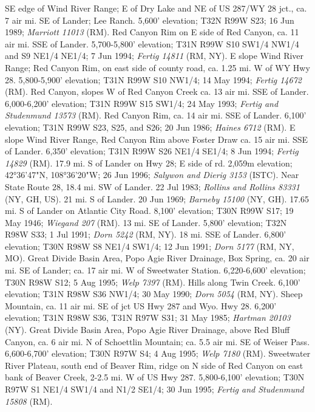 SE edge of Wind River Range; E of Dry Lake and NE of US 287/WY 28 jct., ca. 7
air mi. SE of Lander; Lee Ranch. 5,600' elevation; T32N R99W S23; 16 Jun 1989;
\textit{Marriott 11013} (RM).
Red Canyon Rim on E side of Red Canyon, ca. 11 air mi. SSE of Lander.
5,700-5,800' elevation; T31N R99W S10 SW1/4 NW1/4 and S9 NE1/4 NE1/4;
7 Jun 1994; \textit{Fertig 14811} (RM, NY).
E slope Wind River Range; Red Canyon Rim, on east side of county road, ca. 1.25
mi. W of WY Hwy 28. 5,800-5,900' elevation; T31N R99W S10 NW1/4; 14 May 1994;
\textit{Fertig 14672} (RM).
Red Canyon, slopes W of Red Canyon Creek ca. 13 air mi. SSE of Lander.
6,000-6,200' elevation; T31N R99W S15 SW1/4; 24 May 1993;
\textit{Fertig and Studenmund 13573} (RM).
Red Canyon Rim, ca. 14 air mi. SSE of Lander. 6,100' elevation; T31N R99W S23,
S25, and S26; 20 Jun 1986; \textit{Haines 6712} (RM).
E slope Wind River Range, Red Canyon Rim above Foster Draw ca. 15 air mi. SSE
of Lander.  6,350' elevation; T31N R99W S26 NE1/4 SE1/4; 8 Jun 1994;
\textit{Fertig 14829} (RM).
17.9 mi. S of Lander on Hwy 28; E side of rd. 2,059m elevation;
42°36'47"N, 108°36'20"W; 26 Jun 1996; \textit{Salywon and Dierig 3153} (ISTC).
Near State Route 28, 18.4 mi. SW of Lander. 22 Jul 1983;
\textit{Rollins and Rollins 83331} (NY, GH, US).
21 mi. S of Lander. 20 Jun 1969; \textit{Barneby 15100} (NY, GH).
17.65 mi. S of Lander on Atlantic City Road. 8,100' elevation; T30N R99W S17;
19 May 1946; \textit{Wiegand 207} (RM).
13 mi. SE of Lander. 5,800' elevation; T32N R98W S33; 1 Jul 1991;
\textit{Dorn 5242} (RM, NY).
18 mi. SSE of Lander. 6,800' elevation; T30N R98W S8 NE1/4 SW1/4; 12 Jun 1991;
\textit{Dorn 5177} (RM, NY, MO).
Great Divide Basin Area, Popo Agie River Drainage, Box Spring, ca. 20 air mi.
SE of Lander; ca. 17 air mi. W of Sweetwater Station. 6,220-6,600' elevation;
T30N R98W S12; 5 Aug 1995; \textit{Welp 7397} (RM).
Hills along Twin Creek. 6,100' elevation; T31N R98W S36 NW1/4; 30 May 1990;
\textit{Dorn 5054} (RM, NY).
Sheep Mountain, ca. 11 air mi. SE of jct US Hwy 287 and Wyo. Hwy 28.
6,200' elevation; T31N R98W S36, T31N R97W S31; 31 May 1985;
\textit{Hartman 20103} (NY).
Great Divide Basin Area, Popo Agie River Drainage, above Red Bluff Canyon, ca.
6 air mi. N of Schoettlin Mountain; ca. 5.5 air mi. SE of Weiser Pass.
6,600-6,700' elevation; T30N R97W S4; 4 Aug 1995; \textit{Welp 7180} (RM).
Sweetwater River Plateau, south end of Beaver Rim, ridge on N side of Red Canyon
on east bank of Beaver Creek, 2-2.5 mi. W of US Hwy 287. 5,800-6,100' elevation;
T30N R97W S1 NE1/4 SW1/4 and N1/2 SE1/4; 30 Jun 1995;
\textit{Fertig and Studenmund 15808} (RM).
